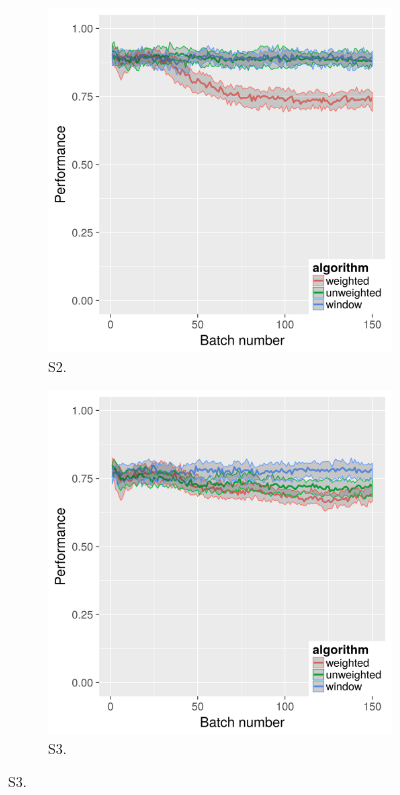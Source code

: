 \begin{figure}[H]
\begin{subfigure}{.45\textwidth}
  \includegraphics[width=.9\linewidth]{s_set/s_set_2_with_weighted_ci_one_size_purity.png}
  \caption{S2.}
\end{subfigure}
\begin{subfigure}{.45\textwidth}
  \centering
  \includegraphics[width=.9\linewidth]{s_set/s_set_3_with_weighted_ci_one_size_purity.png}
  \caption{S3.}
\end{subfigure}%

\end{figure}
